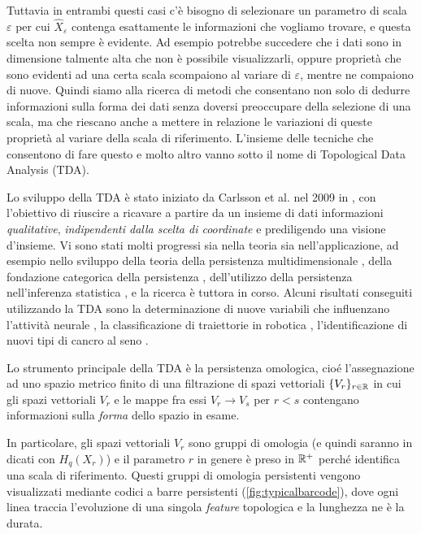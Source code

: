 Tuttavia in entrambi questi casi c'è bisogno di selezionare un parametro di scala $\varepsilon$ per cui $\widehat{X}_\varepsilon$ contenga esattamente le informazioni che vogliamo trovare, e questa scelta non sempre è evidente. Ad esempio potrebbe succedere che i dati sono in dimensione talmente alta che non è possibile visualizzarli, oppure proprietà che sono evidenti ad una certa scala scompaiono al variare di $\varepsilon$, mentre ne compaiono di nuove. Quindi siamo alla ricerca di metodi che consentano non solo di dedurre informazioni sulla forma dei dati senza doversi preoccupare della selezione di una scala, ma che riescano anche a mettere in relazione le variazioni di queste proprietà al variare della scala di riferimento. L'insieme delle tecniche che consentono di fare questo e molto altro vanno sotto il nome di Topological Data Analysis (TDA).

Lo sviluppo della TDA è stato iniziato da Carlsson et al. nel 2009 in \cite{Carlsson2009}, con l'obiettivo di riuscire a ricavare a partire da un insieme di dati informazioni \emph{qualitative}, \emph{indipendenti dalla scelta di coordinate} e prediligendo una visione d'insieme. Vi sono stati molti progressi sia nella teoria sia nell'applicazione, ad esempio nello sviluppo della teoria della persistenza multidimensionale \cite{Cerri2013,Carlsson2009a,Adcock2012,Carlsson2009b}, della fondazione categorica della persistenza
\cite{Curry}, dell'utilizzo della persistenza nell'inferenza statistica \cite{Bubenik2015,Kwitt2015}, e la ricerca è tuttora in corso.
Alcuni risultati conseguiti utilizzando la TDA sono la determinazione di nuove variabili che influenzano l'attività neurale \cite{Spreemann2015}, la classificazione di traiettorie in robotica \cite{Pokorny2014}, l'identificazione di nuovi tipi di cancro al seno \cite{Lum2013}.

Lo strumento principale della TDA è la persistenza omologica, cioé l'assegnazione ad uno spazio metrico finito di una filtrazione di spazi vettoriali $\{V_r\}_{r\in\mathbb{R}}$ in cui gli spazi vettoriali $V_r$ e le mappe fra essi $V_r\to V_s$ per $r<s$ contengano informazioni sulla \emph{forma} dello spazio in esame.

In particolare, gli spazi vettoriali $V_r$ sono gruppi di omologia (e quindi saranno in dicati con $H_q(X_r)$) e il parametro $r$ in genere è preso in $\mathbb{R}^+$ perché identifica una scala di riferimento. Questi gruppi di omologia persistenti vengono visualizzati mediante codici a barre persistenti (\cref{fig:typicalbarcode}), dove ogni linea traccia l'evoluzione di una singola \emph{feature} topologica e la lunghezza ne è la durata.

